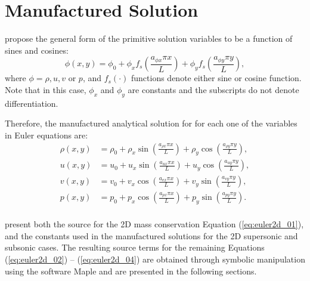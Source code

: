 \documentclass[10pt]{article}
\begin{document}
\section{Manufactured Solution}

\citet{Roy2002} propose the general form of the primitive solution variables to be  a function of sines and cosines:
\begin{equation}
 \label{eq:manufactured01}
  \phi (x,y) = \phi_0+ \phi_x f_s(\frac{a_{\phi x} \pi x}{L}) +  \phi_y f_s(\frac{a_{\phi y} \pi y}{L}),
\end{equation}
where $\phi=\rho,u,v$ or $p$, and $f_s(\cdot)$ functions denote either sine or cosine function. Note that in this case, $\phi_x$ and $\phi_y$ are constants  and the subscripts do not denote differentiation.

Therefore, the manufactured analytical solution for for each one of the variables in Euler equations are:
\begin{equation}
\begin{split}
\label{eq:manufactured02}
\rho\left(x,y\right) &=  \rho_{0}+ \rho_{x} \sin\left(\frac{a_{ \rho x} \pi x}{L}\right)+ \rho_{y} \cos\left(\frac{a_{ \rho y} \pi y}{L}\right),\\
u\left(x,y\right) &= u_{0}+u_{x} \sin\left(\frac{a_{u x} \pi x}{L}\right)+u_{y} \cos\left(\frac{a_{u y} \pi y}{L}\right),\\
v\left(x,y\right) &= v_{0}+v_{x} \cos\left(\frac{a_{v x} \pi x}{L}\right)+v_{y} \sin\left(\frac{a_{v y} \pi y}{L}\right),\\
p\left(x,y\right) &= p_{0}+p_{x} \cos\left(\frac{a_{p x} \pi x}{L}\right)+p_{y} \sin\left(\frac{a_{p y} \pi y}{L}\right).\\
\end{split}
\end{equation}




\citet{Roy2002} present both the source for the 2D mass conservation Equation (\ref{eq:euler2d_01}), and the constants used in the manufactured solutions for the 2D supersonic and subsonic cases. The resulting source terms for the remaining Equations (\ref{eq:euler2d_02}) -- (\ref{eq:euler2d_04}) are obtained through symbolic manipulation using the software Maple and are presented in the following sections.

\end{document}
